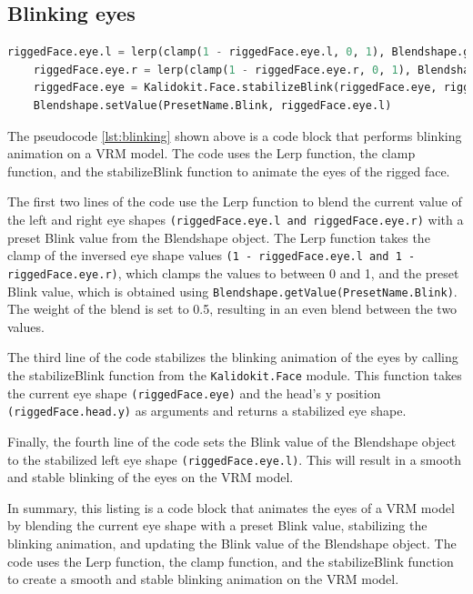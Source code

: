 \subsection{Blinking eyes}
\begin{lstlisting}[language=Python,caption=Blinking of the eyes,label=lst:blinking]
    riggedFace.eye.l = lerp(clamp(1 - riggedFace.eye.l, 0, 1), Blendshape.getValue(PresetName.Blink), 0.5)
    riggedFace.eye.r = lerp(clamp(1 - riggedFace.eye.r, 0, 1), Blendshape.getValue(PresetName.Blink), 0.5)
    riggedFace.eye = Kalidokit.Face.stabilizeBlink(riggedFace.eye, riggedFace.head.y)
    Blendshape.setValue(PresetName.Blink, riggedFace.eye.l)

\end{lstlisting}
The pseudocode \ref{lst:blinking} shown above is a code block that performs blinking animation on a VRM model. 
The code uses the Lerp function, the clamp function, and the stabilizeBlink function 
to animate the eyes of the rigged face.

The first two lines of the code use the Lerp function to blend the current value of the left and right eye shapes 
\texttt{(riggedFace.eye.l and riggedFace.eye.r)} with a preset Blink value from the Blendshape object. The Lerp 
function takes the clamp of the inversed eye shape values \texttt{(1 - riggedFace.eye.l and 1 - riggedFace.eye.r)}, 
which clamps the values to between 0 and 1, and the preset Blink value, which is obtained using \texttt{Blendshape.getValue(PresetName.Blink)}. 
The weight of the blend is set to 0.5, resulting in an even blend between the two values.

The third line of the code stabilizes the blinking animation of the eyes by calling 
the stabilizeBlink function from the \texttt{Kalidokit.Face} module. This function takes the 
current eye shape \texttt{(riggedFace.eye)} and the head's y position \texttt{(riggedFace.head.y)}  as arguments 
and returns a stabilized eye shape.

Finally, the fourth line of the code sets the Blink value of the Blendshape object to the 
stabilized left eye shape \texttt{(riggedFace.eye.l)}. This will result in a smooth and stable blinking  
of the eyes on the VRM model.

In summary, this listing is a code block that animates the eyes of a VRM model by 
blending the current eye shape with a preset Blink value, stabilizing the blinking animation, 
and updating the Blink value of the Blendshape object. The code uses the Lerp function, the clamp 
function, and the stabilizeBlink function to create a smooth and stable blinking animation on the VRM model.

